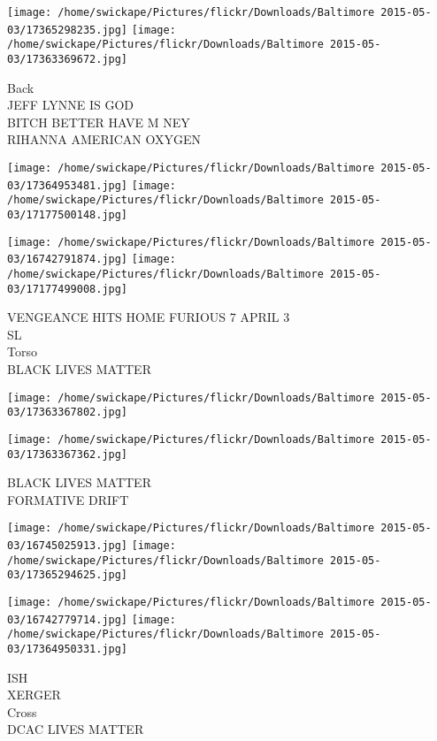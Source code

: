 \documentclass[10pt,letterpaper]{article}
\begin{document}
\texttt{[image: /home/swickape/Pictures/flickr/Downloads/Baltimore 2015-05-03/17365298235.jpg]}
\texttt{[image: /home/swickape/Pictures/flickr/Downloads/Baltimore 2015-05-03/17363369672.jpg]}

Back\\
JEFF LYNNE IS GOD\\
BITCH BETTER HAVE M NEY\\
RIHANNA AMERICAN OXYGEN\\
\pagebreak

\texttt{[image: /home/swickape/Pictures/flickr/Downloads/Baltimore 2015-05-03/17364953481.jpg]}
\texttt{[image: /home/swickape/Pictures/flickr/Downloads/Baltimore 2015-05-03/17177500148.jpg]}

\texttt{[image: /home/swickape/Pictures/flickr/Downloads/Baltimore 2015-05-03/16742791874.jpg]}
\texttt{[image: /home/swickape/Pictures/flickr/Downloads/Baltimore 2015-05-03/17177499008.jpg]}

VENGEANCE HITS HOME FURIOUS 7 APRIL 3\\
SL\\
Torso\\
BLACK LIVES MATTER\\
\pagebreak

\texttt{[image: /home/swickape/Pictures/flickr/Downloads/Baltimore 2015-05-03/17363367802.jpg]}

\vspace{0.25in}
\texttt{[image: /home/swickape/Pictures/flickr/Downloads/Baltimore 2015-05-03/17363367362.jpg]}

BLACK LIVES MATTER\\
FORMATIVE DRIFT\\
\pagebreak

\texttt{[image: /home/swickape/Pictures/flickr/Downloads/Baltimore 2015-05-03/16745025913.jpg]}
\texttt{[image: /home/swickape/Pictures/flickr/Downloads/Baltimore 2015-05-03/17365294625.jpg]}

\texttt{[image: /home/swickape/Pictures/flickr/Downloads/Baltimore 2015-05-03/16742779714.jpg]}
\texttt{[image: /home/swickape/Pictures/flickr/Downloads/Baltimore 2015-05-03/17364950331.jpg]}

ISH\\
XERGER\\
Cross\\
DCAC LIVES MATTER\\
\pagebreak
\end{document}
